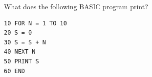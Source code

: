 What does the following BASIC program print?
\begin{verbatim}
10 FOR N = 1 TO 10
20 S = 0
30 S = S + N
40 NEXT N
50 PRINT S
60 END
\end{verbatim}
